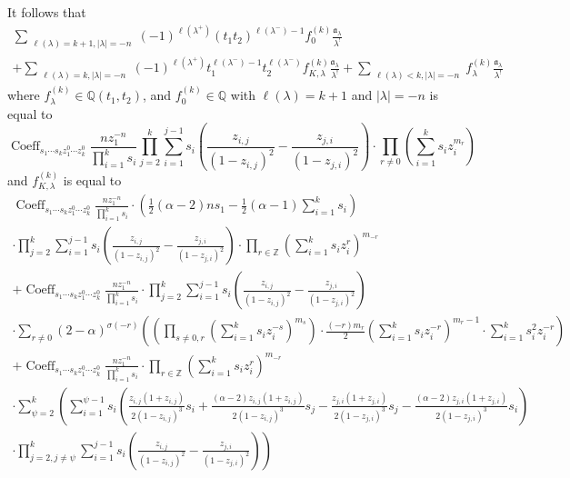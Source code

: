 \documentclass{article}
\newcommand{\lr}[1]{\left({#1}\right)}
\DeclareMathOperator{\Coeff}{Coeff}
\begin{document}
It follows that
\begin{gather*}
\sum_{\substack{\ell(\lambda)=k+1, |\lambda|=-n}} (-1)^{\ell(\lambda^+)} (t_1 t_2)^{\ell(\lambda^-)-1} f_0^{(k)} \frac{\mathfrak{a}_\lambda}{\lambda^!}\\
 + \sum_{\substack{\ell(\lambda)=k, |\lambda|=-n}} (-1)^{\ell(\lambda^+)} t_1^{\ell(\lambda^-)-1}t_2^{\ell(\lambda^-)}  f_{K, \lambda}^{(k)} \frac{\mathfrak{a}_\lambda}{\lambda^!}+\sum_{\substack{\ell(\lambda)<k, |\lambda|=-n}} f_\lambda^{(k)} \frac{\mathfrak{a}_\lambda}{\lambda^!}
\end{gather*}
where \( f_\lambda^{(k)} \in \mathbb{Q}(t_1, t_2) \), and \( f_0^{(k)} \in \mathbb{Q} \) with \( \ell(\lambda) = k + 1 \) and \( |\lambda| = -n \) is equal to
\[
\Coeff_{s_1 \cdots s_{k} z_1^{0} \cdots z_k^0} \frac{n z_1^{-n}}{\prod_{i=1}^k s_i} \prod_{j=2}^k \sum_{i=1}^{j-1} s_i \left( \frac{z_{i,j}}{(1 - z_{i,j})^2} - \frac{z_{j,i}}{(1 - z_{j,i})^2} \right) \cdot \prod_{r \neq 0} \left( \sum_{i=1}^k s_i z_i^{m_r} \right) 
\]
and $f_{K,\lambda}^{(k)}$ is equal to
\begin{gather*}
\Coeff_{s_1 \cdots s_{k} z_1^{0} \cdots z^0_{k} } \frac{n z_1^{-n}}{\prod_{i=1}^k s_i}
\cdot\lr{\frac12 (\alpha-2)ns_1 - \frac12(\alpha-1) \sum_{i=1}^ks_i }\\
\cdot \prod_{j=2}^k \sum_{i=1}^{j-1} s_i \left( \frac{z_{i,j}}{(1 - z_{i,j})^2} - \frac{z_{j,i}}{(1 - z_{j,i})^2} \right)\cdot\prod_{r\in\mathbb{Z}}\lr{\sum_{i=1}^k s_i z_i^r}^{m_{-r}}\\
 + 
 \Coeff_{s_1 \cdots s_{k} z_1^{0} \cdots z^0_{k} } \frac{n z_1^{-n}}{\prod_{i=1}^k s_i}\cdot\prod_{j=2}^k \sum_{i=1}^{j-1} s_i \left( \frac{z_{i,j}}{(1 - z_{i,j})^2} - \frac{z_{j,i}}{(1 - z_{j,i})^2} \right)\\
\cdot\sum_{r\neq0}(2-\alpha)^{\sigma(-r)}\lr{
\lr{
\prod_{s\neq0,r} \lr{\sum_{i=1}^k s_i z_i^{-s}}^{m_{s}}} \cdot
\frac{(-r) m_{r}}{2} \lr{\sum_{i=1}^k s_i z_i^{-r} }^{m_r - 1}\cdot\sum_{i=1}^k s_i^2 z_i^{-r}
}\\
+ \Coeff_{s_1 \cdots s_{k} z_1^{0} \cdots z^0_{k} } \frac{n z_1^{-n}}{\prod_{i=1}^k s_i}\cdot\prod_{r\in\mathbb{Z}}\lr{\sum_{i=1}^k s_i z_i^r}^{m_{-r}}\\
\cdot\sum_{\psi=2}^k\left(\sum_{i=1}^{\psi-1}s_i\lr{\frac{z_{i,j}(1 + z_{i,j})}{2(1 - z_{i,j})^3} s_i + \frac{(\alpha - 2)z_{i,j}(1 + z_{i,j})}{2(1 - z_{i,j})^3} s_j-\frac{z_{j,i}(1 + z_{j,i})}{2(1 - z_{j,i})^3} s_j - \frac{(\alpha - 2)z_{j,i}(1 + z_{j,i})}{2(1 - z_{j,i})^3} s_i}\right.\\
\left.\cdot\prod_{j=2,j\neq\psi}^k \sum_{i=1}^{j-1} s_i \left( \frac{z_{i,j}}{(1 - z_{i,j})^2} - \frac{z_{j,i}}{(1 - z_{j,i})^2} \right)\right)\\
\end{gather*}
\end{document}

